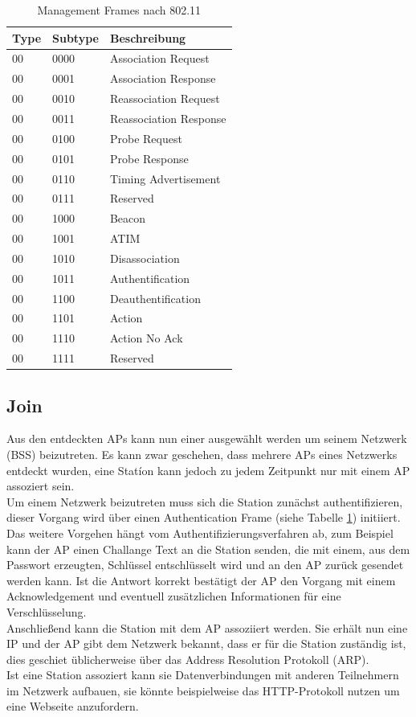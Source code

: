 \begin{table}[h]
	\centering
	\caption{Management Frames nach 802.11}
	\label{table:management}
	\begin{tabular}{l|l|l}
		Type & Subtype & Beschreibung \\
		\hline
		00 & 0000 & Association Request  \\
		00 & 0001 & Association Response  \\
		00 & 0010 & Reassociation Request  \\
		00 & 0011 & Reassociation Response  \\
		00 & 0100 & Probe Request  \\
		00 & 0101 & Probe Response  \\
		00 & 0110 & Timing Advertisement  \\
		00 & 0111 & Reserved  \\
		00 & 1000 & Beacon  \\
		00 & 1001 & ATIM  \\
		00 & 1010 & Disassociation  \\
		00 & 1011 & Authentification  \\
		00 & 1100 & Deauthentification  \\
		00 & 1101 & Action  \\
		00 & 1110 & Action No Ack  \\
		00 & 1111 & Reserved  \\
	\end{tabular}
\end{table}

\subsection{Join}
Aus den entdeckten APs kann nun einer ausgewählt werden um seinem Netzwerk (BSS) beizutreten.
Es kann zwar geschehen, dass mehrere APs eines Netzwerks entdeckt wurden, eine Statíon kann jedoch zu jedem Zeitpunkt nur mit einem AP assoziert sein. \\
Um einem Netzwerk beizutreten muss sich die Station zunächst authentifizieren, dieser Vorgang wird über einen Authentication Frame (siehe Tabelle \ref{table:management}) initiiert. 
Das weitere Vorgehen hängt vom Authentifizierungsverfahren ab, zum Beispiel kann der AP einen Challange Text an die Station senden, die mit  einem, aus dem Passwort erzeugten, Schlüssel entschlüsselt wird und an den AP zurück gesendet werden kann. 
Ist die Antwort korrekt bestätigt der AP den Vorgang mit einem Acknowledgement und eventuell zusätzlichen Informationen für eine Verschlüsselung. \\
Anschließend kann die Station mit dem AP assoziiert werden. 
Sie erhält nun eine IP und der AP gibt dem Netzwerk bekannt, dass er für die Station zuständig ist, dies geschiet  üblicherweise über das Address Resolution Protokoll (ARP). \\
Ist eine Station assoziert kann sie Datenverbindungen mit anderen Teilnehmern im Netzwerk aufbauen, sie könnte beispielweise das HTTP-Protokoll nutzen um eine Webseite anzufordern.


